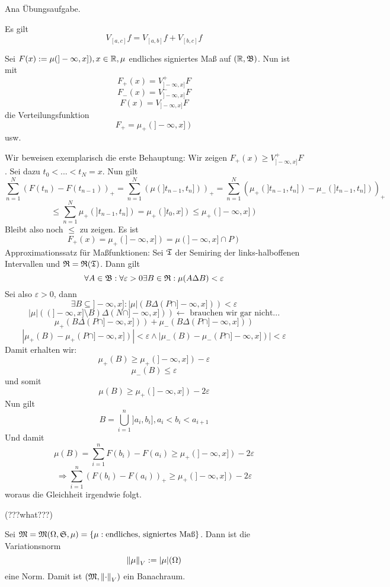 	\begin{bew}
		Ana Übungsaufgabe.
	\end{bew}

	\begin{satz}
		Es gilt 
		\[ V_{[a,c]}f=V_{[a,b]} f+V_{[b,c]}f \]
	\end{satz}

	\begin{satz}
		Sei $F(x):=\mu(]-\infty,x]), x\in\mathbb{R}, \mu$ endliches signiertes Maß auf $(\mathbb{R}, \mathfrak{B})$. Nun ist mit
		\[ F_+(x)=V^+_{]-\infty,x]} F \]
		\[ F_-(x)=V^-_{]-\infty,x]} F \]
		\[ F(x)=V_{]-\infty,x]} F \]
		die Verteilungsfunktion 
		\[ F_+=\mu_+(]-\infty, x]) \]
		usw.
	\end{satz}

	\begin{bew}
		Wir beweisen exemplarisch die erste Behauptung:\newline
		Wir zeigen $F_+(x)\ge V_{]-\infty,x]}^+ F$. Sei dazu $t_0<...<t_N=x$. Nun gilt
		\[ \sum_{n=1}^N(F(t_n)-F(t_{n-1}))_+=\sum_{n=1}^N (\mu(]t_{n-1}, t_n]))_+=\sum_{n=1}^N (\mu_+(]t_{n-1}, t_n])-\mu_-(]t_{n-1}, t_n]))_+ \]
		\[ \le \sum_{n=1}^N \mu_+(]t_{n-1}, t_n])=\mu_+(]t_0,x])\le \mu_+(]-\infty,x]) \]
		Bleibt also noch $\le$ zu zeigen. Es ist 
		\[ F_+(x)=\mu_+(]-\infty,x]) = \mu(]-\infty,x]\cap P) \]
		Approximationssatz für Maßfunktionen: Sei $\mathfrak{T}$ der Semiring der links-halboffenen Intervallen und $\mathfrak{R}=\mathfrak{R}(\mathfrak{T})$. Dann gilt
		\[ \forall A\in\mathfrak{B}: \forall \varepsilon>0\exists B\in\mathfrak{R}: \mu(A\Delta B)<\varepsilon  \]   
		Sei also $\varepsilon>0$, dann 
		\[ \exists B\subseteq]-\infty,x]: |\mu|(B\Delta(P\cap ]-\infty,x]))<\varepsilon \]
		\[ |\mu|((]-\infty,x]\setminus B)\Delta(N\cap]-\infty,x])) \longleftarrow\text{  brauchen wir gar nicht...} \]
		\[ \mu_+(B\Delta (P\cap]-\infty,x]))+\mu_-(B\Delta(P\cap]-\infty,x])) \]
		\[ |\mu_+(B)-\mu_+(P\cap]-\infty,x])|<\varepsilon \land |\mu_-(B)-\mu_-(P\cap]-\infty,x])|<\varepsilon \]
		Damit erhalten wir:
		\[ \mu_+(B)\ge\mu_+(]-\infty,x])-\varepsilon \]
		\[ \mu_-(B)\le\varepsilon \]
		und somit
		\[ \mu(B)\ge\mu_+(]-\infty,x])-2\varepsilon \]
		Nun gilt
		\[ B=\bigcup_{i=1}^n]a_i,b_i], a_i<b_i<a_{i+1} \]
		Und damit
		\[ \mu(B)=\sum_{i=1}^n F(b_i)-F(a_i)\ge\mu_+(]-\infty,x])-2\varepsilon \]
		\[ \Rightarrow \sum_{i=1}^n (F(b_i)-F(a_i))_+\ge\mu_+(]-\infty,x])-2\varepsilon \]
		woraus die Gleichheit irgendwie folgt.
	\end{bew}

	(???what???)
	
	\begin{satz}
		Sei $\mathfrak{M}=\mathfrak{M}(\Omega,\mathfrak{S},\mu)=\{\mu: \text{endliches, signiertes Maß}\}$. Dann ist die Variationsnorm
		\[ \left\|\mu\right\|_V:=|\mu|(\Omega) \]
		eine Norm. Damit ist $(\mathfrak{M}, \left\|\cdot\right\|_V)$ ein Banachraum. 
	\end{satz}

